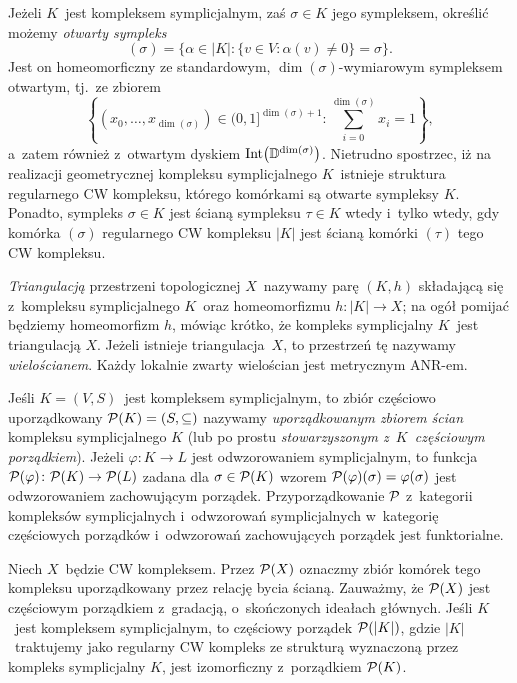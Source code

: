 Jeżeli $K$~jest kompleksem symplicjalnym, zaś $\sigma\in K$ jego sympleksem, określić możemy \textit{otwarty sympleks} \[(\sigma)=\bigl\{\alpha\in |K|:\{v\in V:\alpha(v)\not=0\}=\sigma\bigr\}.\]Jest on homeomorficzny ze standardowym, $\dim(\sigma)$-wymiarowym sympleksem otwartym, tj.~ze zbiorem \[\left\{\left(x_0,\ldots,x_{\dim(\sigma)}\right)\in (0,1]^{\dim(\sigma)+1}: \sum_{i=0}^{\dim(\sigma)}x_i=1\right\},\]
a~zatem również z~otwartym dyskiem $\operatorname{Int}\bigl(\mathbb{D}^{\dim(\sigma)}\bigr)$. Nietrudno spostrzec, iż na realizacji geometrycznej kompleksu symplicjalnego $K$~istnieje struktura regularnego CW kompleksu, którego komórkami są otwarte sympleksy $K$. Ponadto, sympleks $\sigma\in K$ jest ścianą sympleksu $\tau\in K$ wtedy i~tylko wtedy, gdy komórka $(\sigma)$ regularnego CW kompleksu $|K|$ jest ścianą komórki $(\tau)$ tego CW kompleksu.

\textit{Triangulacją} przestrzeni topologicznej $X$~nazywamy parę $(K,h)$ składającą się z~kompleksu symplicjalnego $K$~oraz homeomorfizmu $h\colon |K|\to X$; na ogół pomijać będziemy homeomorfizm $h$, mówiąc krótko, że kompleks symplicjalny $K$~jest triangulacją $X$. Jeżeli istnieje triangulacja~$X$, to przestrzeń tę nazywamy \textit{wielościanem}. Każdy lokalnie zwarty wielościan jest metrycznym ANR-em.

Jeśli $K=(V,S)$~jest kompleksem symplicjalnym, to zbiór częściowo uporządkowany $\mathcal{P}(K)=(S,\subseteq)$ nazywamy \textit{uporządkowanym zbiorem ścian} kompleksu symplicjalnego $K$ (lub po prostu \textit{stowarzyszonym z~$K$~częściowym porządkiem}). Jeżeli $\varphi\colon K\to L$ jest odwzorowaniem symplicjalnym, to funkcja $\mathcal{P}(\varphi)\colon \mathcal{P}(K)\to \mathcal{P}(L)$ zadana dla $\sigma\in \mathcal{P}(K)$ wzorem $\mathcal{P}(\varphi)(\sigma)=\varphi(\sigma)$ jest odwzorowaniem zachowującym porządek. Przyporządkowanie $\mathcal{P}$ z~kategorii kompleksów symplicjalnych i~odwzorowań symplicjalnych w~kategorię częściowych porządków i~odwzorowań zachowujących porządek jest funktorialne.

Niech $X$~będzie CW kompleksem. Przez $\mathcal{P}(X)$ oznaczmy zbiór komórek tego kompleksu uporządkowany przez relację bycia ścianą. Zauważmy, że $\mathcal{P}(X)$ jest częściowym porządkiem z~gradacją, o~skończonych ideałach głównych. Jeśli $K$~jest kompleksem symplicjalnym, to częściowy porządek $\mathcal{P}(|K|)$, gdzie $|K|$~traktujemy jako regularny CW kompleks ze strukturą wyznaczoną przez kompleks symplicjalny $K$, jest izomorficzny z~porządkiem $\mathcal{P}(K)$.

